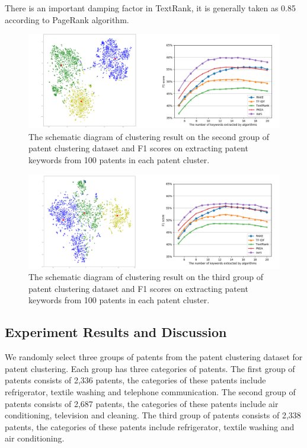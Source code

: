 \documentclass[conference]{IEEEtran}
\begin{document}
	There is an important damping factor in TextRank, it is generally taken as 0.85 according to PageRank algorithm.
	
	\begin{figure}[hb]
		\centering
		\includegraphics[scale=0.34]{kTVq_TSNE_F1.png} 
		\caption{The schematic diagram of clustering result on the second group of patent clustering dataset and F1 scores on extracting patent keywords from 100 patents in each patent cluster.}
		\label{kTVq_TSNE_F1}
	\end{figure}
	\begin{figure}[hb]
		\centering
		\includegraphics[scale=0.34]{bxk_TSNE_F1.png}
		\caption{The schematic diagram of clustering result on the third group of patent clustering dataset and F1 scores on extracting patent keywords from 100 patents in each patent cluster.}
		\label{bxk_TSNE_F1}
	\end{figure}

	\subsection{Experiment Results and Discussion}
	We randomly select three groups of patents from the patent clustering dataset for patent clustering. Each group has three categories of patents. The first group of patents consists of 2,336 patents, the categories of these patents include refrigerator, textile washing and telephone communication. The second group of patents consists of 2,687 patents, the categories of these patents include air conditioning, television and cleaning. The third group of patents consists of 2,338 patents, the categories of these patents include refrigerator, textile washing and air conditioning.
	
\end{document}
